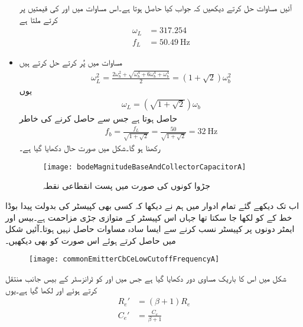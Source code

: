\begin{itemize}
آئیں مساوات  حل کرتے دیکھیں کہ جواب کیا حاصل ہوتا ہے۔اس مساوات میں  اور  کی قیمتیں پر کرتے ملتا ہے
\begin{align*}
\omega_L&=\num{317.254}\\
f_L&=\SI{50.49}{\hertz}
\end{align*}
%
\item
مساوات  میں  پُر کرتے حل کرتے ہیں
\begin{align*}
\omega_L^2=\frac{2 \omega_b^2+\sqrt{\omega_b^4+6 \omega_b^4+\omega_b^4}}{2}=\left(1+\sqrt{2} \right)\omega_b^2
\end{align*}
یوں
\begin{align*}
\omega_L=\left(\sqrt{1+\sqrt{2}}\right)\omega_b
\end{align*}
حاصل ہوتا ہے جس سے  حاصل کرنے کی خاطر
\begin{align*}
f_b=\frac{f_L}{\sqrt{1+\sqrt{2}}}=\frac{50}{\sqrt{1+\sqrt{2}}}=\SI{32}{\hertz}
\end{align*}
رکھنا ہو گا۔شکل  میں صورت حال دکھایا گیا ہے۔
\begin{figure}
\centering
\texttt{[image: bodeMagnitudeBaseAndCollectorCapacitorA]}
\caption{جڑوا کونوں کی صورت میں پست انقطاعی نقطہ}
\label{شکل_تعددی_ردعمل_قابو_کپیسٹر_پست_انقطاعی_تعین_الف}
\end{figure}
\end{itemize}
اب تک دیکھے گئے تمام ادوار میں ہم نے دیکھا کہ کسی بھی کپیسٹر کی بدولت پیدا بوڈا خط کے  کو  لکھا جا سکتا تھا جہاں  اس کپیسٹر کے متوازی جڑی مزاحمت ہے۔بیس  اور ایمٹر دونوں پر کپیسٹر نسب کرنے سے ایسا سادہ مساوات حاصل نہیں ہوتا۔آئیں شکل  میں  حاصل کرتے ہوئے اس صورت کو بھی دیکھیں۔
\begin{figure}
\centering
\texttt{[image: commonEmitterCbCeLowCutoffFrequencyA]}
\caption{}
\label{شکل_تعددی_رد_عمل_قابو_مخارج_کپیسٹر_الف}
\end{figure}
%
شکل  میں اس کا باریک مساوی دور دکھایا گیا ہے جس میں  اور  کو ٹرانزسٹر کے بیس  جانب منتقل کرتے ہوئے  اور  لکھا گیا ہے۔یوں
\begin{align*}
R_e' &=\left(\beta+1 \right) R_e\\
C_e'&=\frac{C_e}{\beta+1}
\end{align*}
